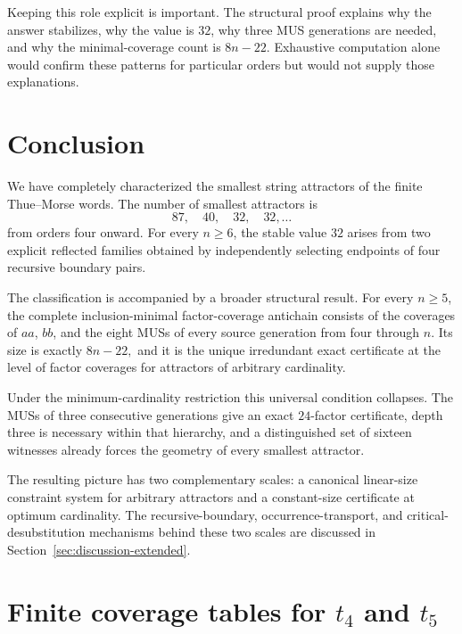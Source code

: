 \documentclass[11pt,a4paper]{article}
\theoremstyle{definition}\newtheorem{definition}[theorem]{Definition}
\theoremstyle{remark}\newtheorem{remark}[theorem]{Remark}
\begin{document}
Keeping this role explicit is important.  The structural proof explains why the answer stabilizes, why the value is $32$, why three MUS generations are needed, and why the minimal-coverage count is $8n-22$.  Exhaustive computation alone would confirm these patterns for particular orders but would not supply those explanations.


\section{Conclusion}
\label{sec:conclusion-extended}

We have completely characterized the smallest string attractors of the finite Thue--Morse words.  The number of smallest attractors is
\[
 87,\quad40,\quad32,\quad32,\ldots
\]
from orders four onward.  For every $n\ge6$, the stable value $32$ arises from two explicit reflected families obtained by independently selecting endpoints of four recursive boundary pairs.

The classification is accompanied by a broader structural result.  For every $n\ge5$, the complete inclusion-minimal factor-coverage antichain consists of the coverages of $aa$, $bb$, and the eight MUSs of every source generation from four through $n$.  Its size is exactly
$
 8n-22,
$
and it is the unique irredundant exact certificate at the level of factor coverages for attractors of arbitrary cardinality.

Under the minimum-cardinality restriction this universal condition collapses.  The MUSs of three consecutive generations give an exact $24$-factor certificate, depth three is necessary within that hierarchy, and a distinguished set of sixteen witnesses already forces the geometry of every smallest attractor.

The resulting picture has two complementary scales: a canonical linear-size constraint system for arbitrary attractors and a constant-size certificate at optimum cardinality.  The recursive-boundary, occurrence-transport, and critical-desubstitution mechanisms behind these two scales are discussed in Section~\ref{sec:discussion-extended}.






\clearpage 

\appendix
\section{Finite coverage tables for \texorpdfstring{$t_4$ and $t_5$}{t4 and t5}}
\label{app:finite-tables}
\end{document}
